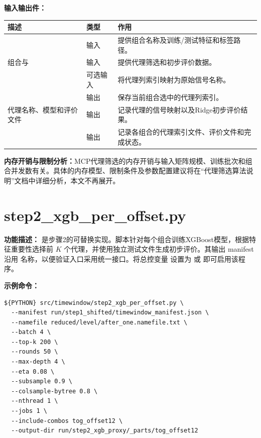 \textbf{输入输出件：}
\begin{longtable}{L{0.34\textwidth}L{0.13\textwidth}L{0.41\textwidth}}
\toprule 描述 & 类型 & 作用 \\ \midrule
{} & 输入 & 提供组合名称及训练/测试特征和标签路径。 \\
组合与 & 输入 & 提供代理筛选和初步评价数据。 \\
 & 可选输入 & 将代理列索引映射为原始信号名称。 \\
 & 输出 & 保存当前组合选中的代理列索引。 \\
代理名称、模型和评价文件 & 输出 & 记录代理的信号映射以及Ridge初步评价结果。 \\
 & 输出 & 记录各组合的代理索引文件、评价文件和完成状态。 \\
\bottomrule
\end{longtable}

\textbf{内存开销与限制分析：}MCP代理筛选的内存开销与输入矩阵规模、训练批次和组合并发数有关。具体的内存模型、限制条件及参数配置建议将在“代理筛选算法说明”文档中详细分析，本文不再展开。


\section{step2\_xgb\_per\_offset.py}

\textbf{功能描述：} 是步骤2的可替换实现。脚本针对每个组合训练XGBoost模型，根据特征重要性选择前 $K$ 个代理，并使用独立测试文件生成初步评价。其输出 manifest 沿用  名称，以便验证入口采用统一接口。将总控变量  设置为  或  即可启用该程序。

\textbf{示例命令：}
\begin{lstlisting}
${PYTHON} src/timewindow/step2_xgb_per_offset.py \
  --manifest run/step1_shifted/timewindow_manifest.json \
  --namefile reduced/level/after_one.namefile.txt \
  --batch 4 \
  --top-k 200 \
  --rounds 50 \
  --max-depth 4 \
  --eta 0.08 \
  --subsample 0.9 \
  --colsample-bytree 0.8 \
  --nthread 1 \
  --jobs 1 \
  --include-combos tog_offset12 \
  --output-dir run/step2_xgb_proxy/_parts/tog_offset12
\end{lstlisting}

